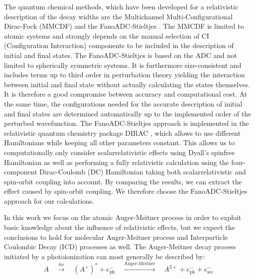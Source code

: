 \documentclass[aps,amssymb,preprint,a4paper,longbibliography]{revtex4}
\begin{document}
The quantum chemical methods, which have been developed for a relativistic
description of the decay widths are the Multichannel Multi-Configurational
Dirac-Fock (MMCDF) \cite{Fritzsche11} and the FanoADC-Stieltjes
{\cite{Averbukh05,Fasshauer15_1}}.
The MMCDF is limited to atomic systems and strongly depends on
the manual selection of CI (Configuration
Interaction) components to be included in the description of initial and      
final states.
The FanoADC-Stieltjes is based on the ADC and not limited to spherically symmetric
systems.
It is furthermore size-consistent and includes terms up to third order
in perturbation theory yielding the interaction between initial and final state
without actually calculating the states themselves.
It is therefore a good compromise between
accuracy and computational cost. At the same time, the configurations needed for the
accurate description of initial and final states are determined automatically up to
the implemented order of the perturbed wavefunction.
The FanoADC-Stieltjes approach is implemented in the relativistic
quantum chemistry package
DIRAC \cite{DIRAC17}, which allows to use different Hamiltonians while keeping
all other parameters constant. This allows us to computationally only consider
scalarrelativistic effects using
{Dyall's spinfree Hamiltonian \cite{Dyall94}}
as well as
performing a fully relativistic calculation using the four-component
Dirac-Coulomb (DC) Hamiltonian taking both scalarrelativistic and
spin-orbit coupling into account.
By comparing the results, we can extract the effect caused by spin-orbit coupling.
We therefore choose the FanoADC-Stieltjes approach for our calculations.


In this work we focus on the atomic Auger-Meitner process     
in order                                      
to exploit basic knowledge about the influence of relativistic effects,
but we expect the conclusions to hold for molecular Auger-Meitner process and
Interparticle Coulombic Decay (ICD) processes
\cite{Cederbaum97,Marburger03,Hergenhahn11,Jahnke15} as well.
The Auger-Meitner decay process initiated by a photoionization
can most generally be described by:
\begin{equation*}                                               
 A \quad \xrightarrow{h\nu}\quad (A^+)^* + e^-_\text{ph} \quad       
    \xrightarrow{\text{Auger-Meitner}} \quad A^{2+} + e^-_\text{ph} + e^-_\text{sec}     
\end{equation*}                                                 
                                                                
\end{document}
